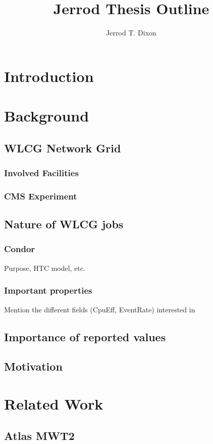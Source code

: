 \documentclass[]{article}
\title{Jerrod Thesis Outline}
\author{Jerrod T. Dixon}
\begin{document}
\maketitle

\section{Introduction}

\section{Background}
\subsection{WLCG Network Grid}
\subsubsection{Involved Facilities}
\subsubsection{CMS Experiment}
\subsection{Nature of WLCG jobs}
\subsubsection{Condor}
Purpose, HTC model, etc.
\subsubsection{Important properties}
Mention the different fields (CpuEff, EventRate) interested in
\subsection{Importance of reported values}
\subsection{Motivation}
\section{Related Work}
\subsection{Atlas MWT2}
\end{document}

